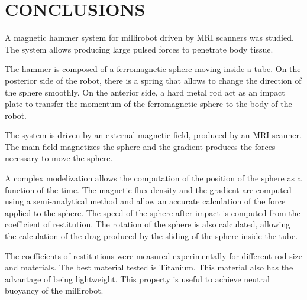 \documentclass[letterpaper, 10 pt, conference]{ieeeconf}  %
\begin{document}
\section{CONCLUSIONS}

A magnetic hammer system for millirobot driven by MRI scanners was studied. The system allows producing large pulsed forces to penetrate body tissue.\par
The hammer is composed of a ferromagnetic sphere moving inside a tube. On the posterior side of the robot, there is a spring that allows to change the direction of the sphere smoothly. On the anterior side, a hard metal rod act as an impact plate to transfer the momentum of the ferromagnetic sphere to the body of the robot.\par
The system is driven by an external magnetic field, produced by an MRI scanner. The main field magnetizes the sphere and the gradient produces the forces necessary to move the sphere.\par
 A complex modelization allows the computation of the position of the sphere as a function of the time. The magnetic flux density and the gradient are computed using a semi-analytical method and allow an accurate calculation of the force applied to the sphere. The speed of the sphere after impact is computed from the coefficient of restitution. The rotation of the sphere is also calculated, allowing the calculation of the drag produced by the sliding of the sphere inside the tube.\par
The coefficients of restitutions were measured experimentally for different rod size and materials. The best material tested is Titanium. This material also has the advantage of being lightweight. This property is useful to achieve neutral buoyancy of the millirobot. 

\addtolength{\textheight}{-12cm}   %







\end{document}
